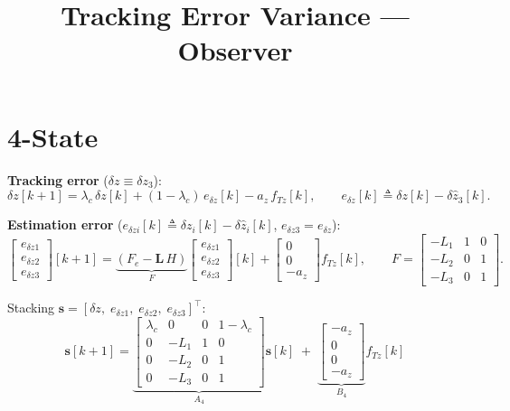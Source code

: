 \documentclass[11pt,a4paper]{article}
\title{Tracking Error Variance --- Observer}
\author{}\date{}
\newcommand{\dz}{\delta z}
\newcommand{\dzhat}[1]{\delta\hat{z}_{#1}}
\newcommand{\edz}{e_{\delta z}}
\newcommand{\fTz}{f_{Tz}}
\newcommand{\az}{a_z}
\newcommand{\lc}{\lambda_c}
\begin{document}
\maketitle
\vspace{-2em}

\section{4-State}


\medskip
\textbf{Tracking error} ($\dz\equiv\dz_3$):
\begin{equation}
  \dz[k\!+\!1]
  = \lc\,\dz[k]
    + (1\!-\!\lc)\,\edz[k]
    - \az\,\fTz[k],
  \qquad
  \edz[k] \triangleq \dz[k] - \dzhat{3}[k].
  \label{eq:dz}
\end{equation}

\textbf{Estimation error}
($e_{\dz i}[k]\triangleq\dz_i[k]-\dzhat{i}[k]$,\; $e_{\dz 3}=\edz$):
\begin{equation}
  \begin{bmatrix}e_{\dz 1}\\e_{\dz 2}\\e_{\dz 3}\end{bmatrix}[k\!+\!1]
  = \underbrace{(F_e - \bm{L}\,H)}_{\displaystyle F}
  \begin{bmatrix}e_{\dz 1}\\e_{\dz 2}\\e_{\dz 3}\end{bmatrix}[k]
  + \begin{bmatrix}0\\0\\-\az\end{bmatrix}\fTz[k],
  \qquad
  F = \begin{bmatrix}-L_1&1&0\\-L_2&0&1\\-L_3&0&1\end{bmatrix}.
  \label{eq:edz}
\end{equation}

Stacking $\bm{s}=[\dz,\;e_{\dz 1},\;e_{\dz 2},\;e_{\dz 3}]^\top$:
\begin{equation}
  \boxed{\;
  \bm{s}[k\!+\!1]
  = \underbrace{
  \begin{bmatrix}
    \lc & 0 & 0 & 1\!-\!\lc \\[2pt]
    0 & -L_1 & 1 & 0 \\
    0 & -L_2 & 0 & 1 \\
    0 & -L_3 & 0 & 1
  \end{bmatrix}}_{A_4}
  \bm{s}[k]
  \;+\;
  \underbrace{
  \begin{bmatrix}-\az\\0\\0\\-\az\end{bmatrix}}_{B_4}
  \fTz[k]
  \;}
  \label{eq:aug}
\end{equation}
\end{document}
